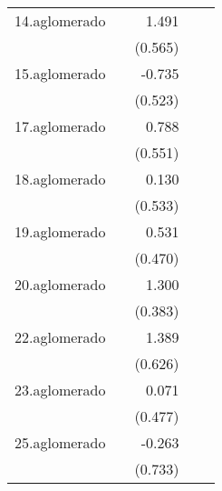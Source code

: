 {\begin{longtable}{l*{4}{D{.}{.}{-1}}}
\addlinespace
14.aglomerado&                     &       1.491\sym{**} &                     &                     \\
            &                     &     (0.565)         &                     &                     \\
\addlinespace
15.aglomerado&                     &      -0.735         &                     &                     \\
            &                     &     (0.523)         &                     &                     \\
\addlinespace
17.aglomerado&                     &       0.788         &                     &                     \\
            &                     &     (0.551)         &                     &                     \\
\addlinespace
18.aglomerado&                     &       0.130         &                     &                     \\
            &                     &     (0.533)         &                     &                     \\
\addlinespace
19.aglomerado&                     &       0.531         &                     &                     \\
            &                     &     (0.470)         &                     &                     \\
\addlinespace
20.aglomerado&                     &       1.300\sym{***}&                     &                     \\
            &                     &     (0.383)         &                     &                     \\
\addlinespace
22.aglomerado&                     &       1.389\sym{*}  &                     &                     \\
            &                     &     (0.626)         &                     &                     \\
\addlinespace
23.aglomerado&                     &       0.071         &                     &                     \\
            &                     &     (0.477)         &                     &                     \\
\addlinespace
25.aglomerado&                     &      -0.263         &                     &                     \\
            &                     &     (0.733)         &                     &                     \\

\end{longtable}}
